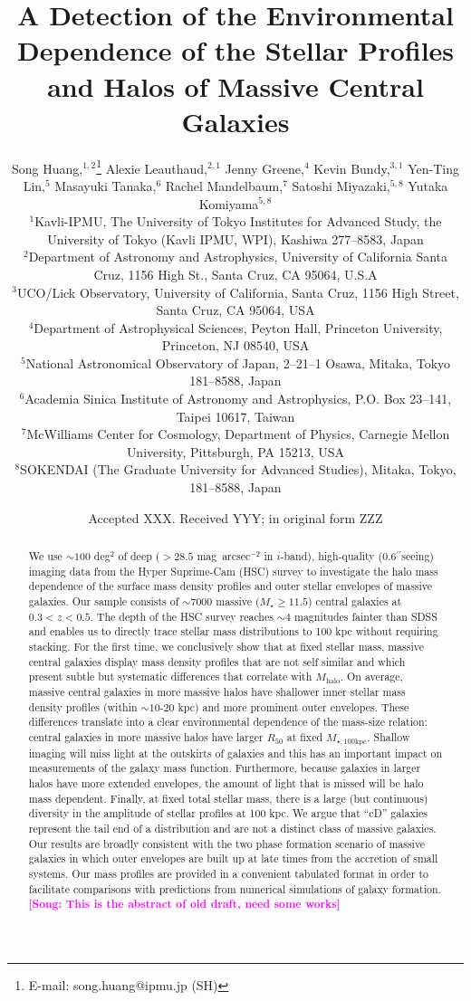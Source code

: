 \documentclass[a4paper,fleqn,usenatbib]{mnras}
\title[Structure and Environment of Massive Galaxies]{
       A Detection of the Environmental Dependence of the Stellar Profiles and Halos
       of Massive Central Galaxies}
\author[S. Huang et al.]{
        Song Huang,$^{1,2}$\thanks{E-mail: song.huang@ipmu.jp (SH)}
        Alexie Leauthaud,$^{2,1}$
        Jenny Greene,$^{4}$
        Kevin Bundy,$^{3,1}$
        \newauthor
        Yen-Ting Lin,$^{5}$
        Masayuki Tanaka,$^{6}$
        Rachel Mandelbaum,$^{7}$
        Satoshi Miyazaki,$^{5,8}$
        \newauthor
        Yutaka Komiyama$^{5,8}$
        \\
        $^{1}$Kavli-IPMU, The University of Tokyo Institutes for Advanced Study, 
              the University of Tokyo (Kavli IPMU, WPI), Kashiwa 277--8583, Japan\\
        $^{2}$Department of Astronomy and Astrophysics, University of California 
              Santa Cruz, 1156 High St., Santa Cruz, CA 95064, U.S.A\\
        $^{3}$UCO/Lick Observatory, University of California, Santa Cruz,
              1156 High Street, Santa Cruz, CA 95064, USA\\
        $^{4}$Department of Astrophysical Sciences, Peyton Hall,
              Princeton University, Princeton, NJ 08540, USA \\
        $^{5}$National Astronomical Observatory of Japan, 2--21--1 Osawa, Mitaka, 
              Tokyo 181--8588, Japan\\
        $^{6}$Academia Sinica Institute of Astronomy and Astrophysics, 
              P.O. Box 23--141, Taipei 10617, Taiwan\\
        $^{7}$McWilliams Center for Cosmology, Department of Physics, 
              Carnegie Mellon University, Pittsburgh, PA 15213, USA\\
        $^{8}$SOKENDAI (The Graduate University for Advanced Studies), Mitaka,
              Tokyo, 181--8588, Japan
        }
\date{Accepted XXX. Received YYY; in original form ZZZ}
\def\asec{$^{\prime\prime}$}
\def\sb{mag~arcsec$^{-2}$}
\def\mstar{{$M_{\star}$}}
\def\mhalo{{$M_{\mathrm{halo}}$}}
\def\mtot{{$M_{\star,100\mathrm{kpc}}$}}
\newcommand{\song}[1]{\textcolor{magenta}{\textbf{[Song: #1]}}}
\begin{document}
\label{firstpage}
\pagerange{\pageref{firstpage}--\pageref{lastpage}}

\maketitle


\begin{abstract} 
    
    We use ${\sim}100$ deg$^2$ of deep ($>28.5$ \sb{} in $i$-band), high-quality 
    (0.6\asec seeing) imaging data from the Hyper Suprime-Cam (HSC) survey 
    to investigate the halo mass dependence of the surface mass density profiles 
    and outer stellar envelopes of massive galaxies. 
    Our sample consists of ${\sim}7000$ massive (\mstar{}$\geq 11.5$) central galaxies 
    at $0.3 < z < 0.5$. 
    The depth of the HSC survey reaches ${\sim}4$ magnitudes fainter than SDSS and 
    enables us to directly trace stellar mass distributions to 100 kpc without 
    requiring stacking. 
    For the first time, we conclusively show that at fixed stellar mass, massive central 
    galaxies display mass density profiles that are not self similar and which 
    present subtle but systematic differences that correlate with \mhalo{}. 
    On average, massive central galaxies in more massive halos have shallower inner 
    stellar mass density profiles (within ${\sim}10$-$20$ kpc) and more prominent outer 
    envelopes. 
    These differences translate into a clear environmental dependence of the mass-size 
    relation: central galaxies in more massive halos have larger $R_{\mathrm{50}}$ 
    at fixed \mtot{}. 
    Shallow imaging will miss light at the outskirts of galaxies and this has an 
    important impact on measurements of the galaxy mass function. 
    Furthermore, because galaxies in larger halos have more extended envelopes, 
    the amount of light that is missed will be halo mass dependent. 
    Finally, at fixed total stellar mass, there is a large (but continuous) diversity 
    in the amplitude of stellar profiles at 100 kpc. 
    We argue that ``cD'' galaxies represent the tail end of a distribution and 
    are not a distinct class of massive galaxies. 
    Our results are broadly consistent with the two phase formation scenario of 
    massive galaxies in which outer envelopes are built up at late times from the 
    accretion of small systems. 
    Our mass profiles are provided in a convenient tabulated format in order to 
    facilitate comparisons with predictions from numerical simulations of galaxy 
    formation. 
    \song{This is the abstract of old draft, need some works}
    
\end{abstract}
\end{document}
